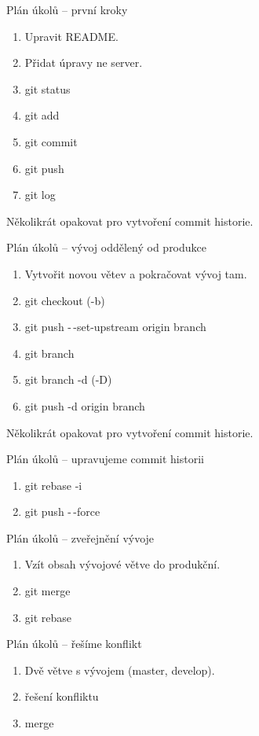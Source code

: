 \documentclass[14pt]{beamer}
\begin{document}
	\begin{frame}{Plán úkolů -- první kroky}
	\begin{enumerate}
		\item Upravit README.
		\item Přidat úpravy ne server.
		\item git status
		\item git add
		\item git commit
		\item git push
		\item git log
	\end{enumerate}
   Několikrát opakovat pro vytvoření commit historie.
	\end{frame}

	\begin{frame}{Plán úkolů -- vývoj oddělený od produkce}
	\begin{enumerate}
		\item Vytvořit novou větev a pokračovat vývoj tam.
		\item git checkout (-b)
		\item git push -\,-set-upstream origin branch
		\item git branch
		\item git branch -d (-D)
		\item git push -d origin branch
	\end{enumerate}
	Několikrát opakovat pro vytvoření commit historie.
	\end{frame}

	\begin{frame}{Plán úkolů -- upravujeme commit historii}
		\begin{enumerate}
			\item git rebase -i
			\item git push -\,-force
		\end{enumerate}
	\end{frame}
	

	\begin{frame}{Plán úkolů -- zveřejnění vývoje}
		\begin{enumerate}
			\item Vzít obsah vývojové větve do produkční.
			\item git merge
			\item git rebase
		\end{enumerate}
	\end{frame}

	\begin{frame}{Plán úkolů -- řešíme konflikt}
		\begin{enumerate}
			\item Dvě větve s vývojem (master, develop).
			\item řešení konfliktu
			\item merge
		\end{enumerate}
	\end{frame}
\end{document}
